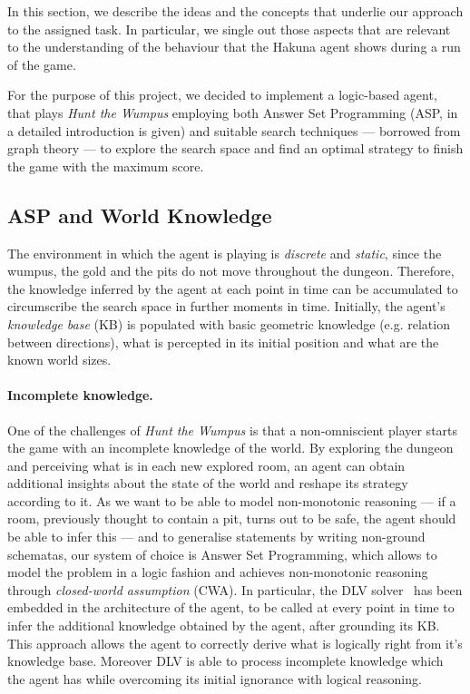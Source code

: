 \documentclass{llncs}
\newcommand{\htw}{\emph{Hunt the Wumpus }}
\begin{document}
In this section, we describe the ideas and the concepts that underlie our approach to the assigned task.
In particular, we single out those aspects that are relevant to the understanding of the behaviour that the Hakuna agent shows during a run of the game.

For the purpose of this project, we decided to implement a logic-based agent, that plays \htw employing both Answer Set Programming (ASP, in~\cite{ASPprimer} a detailed introduction is given) and suitable search techniques --- borrowed from graph theory --- to explore the search space and find an optimal strategy to finish the game with the maximum score.

\subsection{ASP and World Knowledge}

The environment in which the agent is playing is \emph{discrete} and \emph{static}, since the wumpus, the gold and the pits do not move throughout the dungeon.
Therefore, the knowledge inferred by the agent at each point in time can be accumulated to circumscribe the search space in further moments in time.
Initially, the agent's \emph{knowledge base} (KB) is populated with basic geometric knowledge (e.g. relation between directions), what is percepted in its initial position and what are the known world sizes.

\paragraph{Incomplete knowledge.} One of the challenges of \htw is that a non-omniscient player starts the game with an incomplete knowledge of the world.
By exploring the dungeon and perceiving what is in each new explored room, an agent can obtain additional insights about the state of the world and reshape its strategy according to it.
As we want to be able to model non-monotonic reasoning --- if a room, previously thought to contain a pit, turns out to be safe, the agent should be able to infer this --- and to generalise statements by writing non-ground schematas, our system of choice is Answer Set Programming, which allows to model the problem in a logic fashion and achieves non-monotonic reasoning through \emph{closed-world assumption} (CWA).
In particular, the DLV solver~\cite{DLV-system} has been embedded in the architecture of the agent, to be called at every point in time to infer the additional knowledge obtained by the agent, after grounding its KB.
This approach allows the agent to correctly derive what is logically right from it's knowledge base. Moreover DLV is able to process incomplete knowledge which the agent has while overcoming its initial ignorance with logical reasoning.
\end{document}
